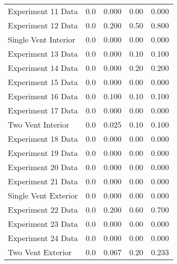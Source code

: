 \begin{tabular}{lrrrr}
Experiment 11 Data   &       0.0 &            0.000 &             0.00 &      0.000 \\
Experiment 12 Data   &       0.0 &            0.200 &             0.50 &      0.800 \\
Single Vent Interior &       0.0 &            0.000 &             0.00 &      0.000 \\
Experiment 13 Data   &       0.0 &            0.000 &             0.10 &      0.100 \\
Experiment 14 Data   &       0.0 &            0.000 &             0.20 &      0.200 \\
Experiment 15 Data   &       0.0 &            0.000 &             0.00 &      0.000 \\
Experiment 16 Data   &       0.0 &            0.100 &             0.10 &      0.100 \\
Experiment 17 Data   &       0.0 &            0.000 &             0.00 &      0.000 \\
Two Vent Interior    &       0.0 &            0.025 &             0.10 &      0.100 \\
Experiment 18 Data   &       0.0 &            0.000 &             0.00 &      0.000 \\
Experiment 19 Data   &       0.0 &            0.000 &             0.00 &      0.000 \\
Experiment 20 Data   &       0.0 &            0.000 &             0.00 &      0.000 \\
Experiment 21 Data   &       0.0 &            0.000 &             0.00 &      0.000 \\
Single Vent Exterior &       0.0 &            0.000 &             0.00 &      0.000 \\
Experiment 22 Data   &       0.0 &            0.200 &             0.60 &      0.700 \\
Experiment 23 Data   &       0.0 &            0.000 &             0.00 &      0.000 \\
Experiment 24 Data   &       0.0 &            0.000 &             0.00 &      0.000 \\
Two Vent Exterior    &       0.0 &            0.067 &             0.20 &      0.233 \\
\bottomrule
\end{tabular}
